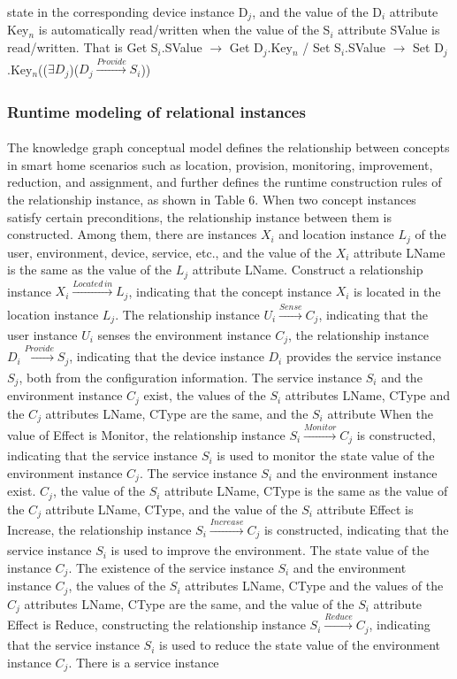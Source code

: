 state in the corresponding device instance D$_{j}$, and the value of the D$_{i}$ attribute Key$_{n}$ is automatically read/written when the value of the S$_{i}$ attribute SValue is read/written. That is Get S$_{i}$.SValue $\to$ Get D$_{j}$.Key$_{n}$ / Set S$_{i}$.SValue $\to$ Set D$_{j}$.Key$_{n}$(($\exists D_{j}$)($D_{j}\xrightarrow[]{Provide} S_{i}$))




\subsubsection{Runtime modeling of relational instances}
\paragraph{}
The knowledge graph conceptual model defines the relationship between concepts in smart home scenarios such as location,  provision, monitoring, improvement, reduction, and assignment, and further defines the runtime construction rules of the relationship instance, as shown in Table 6. When two concept instances satisfy certain preconditions, the relationship instance between them is constructed. Among them, there are instances $X_{i}$ and location instance $L_{j}$ of the user, environment, device, service, etc., and the value of the $X_{i}$ attribute LName is the same as the value of the $L_{j}$ attribute LName. Construct a relationship instance $X_{i}\xrightarrow[]{Located\,in}L_{j}$, indicating that the concept instance $X_{i}$ is located in the location instance $L_{j}$. The relationship instance $U_{i}\xrightarrow[]{Sense} C_{j}$, indicating that the user instance $U_{i}$ senses the environment instance $C_{j}$, the relationship instance $D_{i}\xrightarrow[]{Provide}S_{j}$, indicating that the device instance $D_{i}$ provides the service instance $S_{j}$, both from the configuration information. The service instance $S_{i}$ and the environment instance $C_{j}$ exist, the values of the $S_{i}$ attributes LName, CType and the $C_{j}$ attributes LName, CType are the same, and the $S_{i}$ attribute When the value of Effect is Monitor, the relationship instance $S_{i}\xrightarrow[]{Monitor}C_{j}$ is constructed, indicating that the service instance $S_{i}$ is used to monitor the state value of the environment instance $C_{j}$. The service instance $S_{i}$ and the environment instance exist. $C_{j}$, the value of the $S_{i}$ attribute LName, CType is the same as the value of the $C_{j}$ attribute LName, CType, and the value of the $S_{i}$ attribute Effect is Increase, the relationship instance $S_{i}\xrightarrow[]{Increase}C_{j}$ is constructed, indicating that the service instance $S_{i}$ is used to improve the environment. The state value of the instance $C_{j}$. The existence of the service instance $S_{i}$ and the environment instance $C_{j}$, the values of the $S_{i}$ attributes LName, CType and the values of the $C_{j}$ attributes LName, CType are the same, and the value of the $S_{i}$ attribute Effect is Reduce, constructing the relationship instance $S_{i}\xrightarrow[]{Reduce}C_{j}$, indicating that the service instance $S_{i}$ is used to reduce the state value of the environment instance $C_{j}$. There is a service instance 